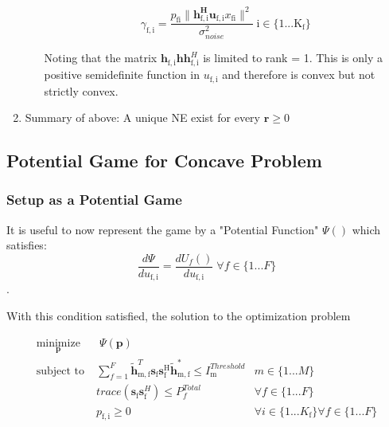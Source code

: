 \documentclass[12pt,a4paper]{report}
\begin{document}
\begin{enumerate}
\begin{itemize}
	\begin{equation}\label{zf_snr_expanded}
	\gamma_{\mathrm{f,i}} = \frac{p_{\mathrm{fi}}\|\mathbf{h^H_{\mathrm{f,i}}
	u_{\mathrm{f,i}}}x_{\mathrm{fi}}\|^2}
	{\sigma^2_{noise} }
	  \; \mathrm{i \in \{1 ... K_f\}}
	\end{equation}
	
	Noting that the matrix 
	$\mathbf{h}_{\mathrm{f,i}}\mathbf{hh}^H_{\mathrm{f,i}}$
	is limited to rank = 1. This is only a positive semidefinite function in 
	$u_{\mathrm{f,i}}$ and therefore is convex but not strictly convex.


\end{itemize}


\item
Summary of above: 
A unique NE exist for every $\mathbf{r} \geq 0$ 

\end{enumerate}

\subsection{Potential Game for Concave Problem}

\subsubsection{Setup as a Potential Game}
It is useful to now represent the game by a "Potential Function" 
$ \Psi(\mathbf{})$ which satisfies:
\begin{equation}\label{potential_game_condition}
\frac{d\Psi}{du_\mathrm{f,i}} = \frac{d U_f()}{du_\mathrm{f,i}} \; \forall f \in \{1...F\}
\end{equation}.


With this condition satisfied, the solution to the optimization problem 

	
		\begin{subequations}
	\label{optim}
	\begin{align}
	    \underset{\mathbf{p}}{\text{minimize}}
	    & \; \Psi(\mathbf{p}) \label{potential_game} \\
	    \text{subject to} \; &
	  \sum^F_{f=1} \mathbf{\tilde{h}}_{\mathrm{m,f}}^T  \mathbf{s}_{\mathrm{f}} 						
	\mathbf{s_{\mathrm{f}}^{\mathrm{H}}} \mathbf{\tilde{h}_{\mathrm{m,f}}^*} \leq I^{Threshold}		
	_{\mathrm{m}} & m \in \{1 ...M\} 
		\label{interference_const}\\
        & trace(\mathbf{s}_\mathrm{f}\mathbf{s}_\mathrm{f}^H)  \leq P^{Total}_{f}  \label{power_const}
        & \forall f \in \{1 ... F\}\\
        & p_{\mathrm{f,i}} \geq 0 &  \forall i \in \{1 ...K_{\mathrm{f}}\} \forall f \in \{1 ... F\}\label{pos_power_const}
	\end{align}
	\end{subequations}
\end{document}
